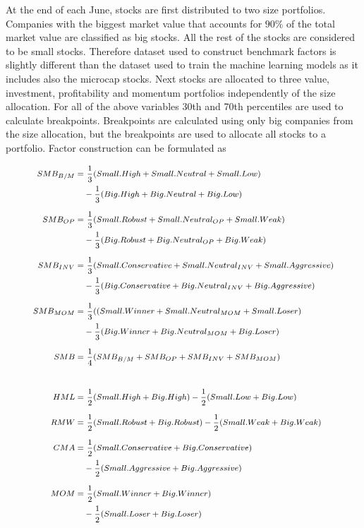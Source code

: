 \documentclass[12pt]{article}
\begin{document}
At the end of each June, stocks are first distributed to two size portfolios. Companies with the biggest market value that accounts for $90\%$ of the total market value are classified as big stocks. All the rest of the stocks are considered to be small stocks. Therefore dataset used to construct benchmark factors is slightly different than the dataset used to train the machine learning models as it includes also the microcap stocks. Next stocks are allocated to three value, investment, profitability and momentum portfolios independently of the size allocation. For all of the above variables 30th and 70th percentiles are used to calculate breakpoints. Breakpoints are calculated using only big companies from the size allocation, but the breakpoints are used to allocate all stocks to a portfolio. Factor construction can be formulated as \par

\begin{equation} \label{eq:FF6factors}
\footnotesize
\begin{split}
SMB_{B/M} = & \ \frac{1}{3} (Small.High + Small.Neutral + Small.Low) \\
			& - \frac{1}{3} (Big.High + Big.Neutral + Big.Low) \\[5pt]
SMB_{OP} = & \ \frac{1}{3} (Small.Robust + Small.Neutral_{OP} + Small.Weak)\\
			& - \frac{1}{3} (Big.Robust + Big.Neutral_{OP} + Big.Weak)\\[5pt]
SMB_{INV} = & \ \frac{1}{3} (Small.Conservative + Small.Neutral_{INV} + Small.Aggressive)\\
			& - \frac{1}{3} (Big.Conservative + Big.Neutral_{INV} + Big.Aggressive)\\[5pt]
SMB_{MOM} = & \ \frac{1}{3} ((Small.Winner + Small.Neutral_{MOM} + Small.Loser)\\
		     	& - \frac{1}{3} (Big.Winner + Big.Neutral_{MOM} + Big.Loser)\\[5pt]
SMB = & \ \frac{1}{4} (SMB_{B/M} + SMB_{OP} + SMB_{INV} + SMB_{MOM})\\[20pt]
HML = & \ \frac{1}{2} (Small.High + Big.High) - \frac{1}{2} (Small.Low + Big.Low)\\[5pt]
RMW = & \ \frac{1}{2} (Small.Robust + Big.Robust) - \frac{1}{2} (Small.Weak + Big.Weak)\\[5pt]
CMA = & \ \frac{1}{2} (Small.Conservative + Big.Conservative)\\
		& - \frac{1}{2} (Small.Aggressive + Big.Aggressive)\\[5pt]
MOM = & \ \frac{1}{2} (Small.Winner + Big.Winner)\\
		& - \frac{1}{2} (Small.Loser + Big.Loser)\\
\end{split}
\end{equation}
\end{document}

